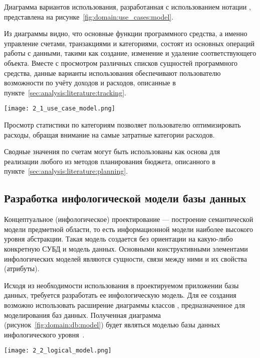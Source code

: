 Диаграмма вариантов использования, разработанная с использованием нотации \uml, представлена на рисунке~\ref{fig:domain:use_cases:model}.

Из диаграммы видно, что основные функции программного средства, а именно управление счетами, транзакциями и категориями, состоят из основных операций работы с данными, такими как создание, изменение и удаление соответствующего объекта.
Вместе с просмотром различных списков сущностей программного средства, данные варианты использования обеспечивают пользователю возможности по учёту доходов и расходов, описанные в пункте~\ref{sec:analysis:literature:tracking}.

\begin{sidewaysfigure}
    \centering
    \texttt{[image: 2\_1\_use\_case\_model.png]}
    \caption{Диаграмма вариантов использования ПС}
    \label{fig:domain:use_cases:model}
\end{sidewaysfigure}

Просмотр статистики по категориям позволяет пользователю оптимизировать расходы, обращая внимание на самые затратные категории расходов.

Сводные значения по счетам могут быть использованы как основа для реализации любого из методов планирования бюджета, описанного в пункте~\ref{sec:analysis:literature:planning}.

\subsection{Разработка инфологической модели базы данных}
\label{sec:domain:db}

Концептуальное (инфологическое) проектирование — построение семантической модели предметной области, то есть информационной модели наиболее высокого уровня абстракции.
Такая модель создается без ориентации на какую-либо конкретную СУБД и модель данных.
Основными конструктивными элементами инфологических моделей являются сущности, связи между ними и их свойства (атрибуты).

Исходя из необходимости использования в проектируемом приложении базы данных, требуется разработать ее инфологическую модель.
Для ее создания возможно использовать расширение диаграммы классов \uml, предназначенное для моделирования баз данных.
Полученная диаграмма (рисунок~\ref{fig:domain:db:model}) будет являться моделью базы данных инфологического уровня~\cite{kulikov_db_workbook}.

\begin{sidewaysfigure}
    \centering
    \texttt{[image: 2\_2\_logical\_model.png]}
    \caption{Инфологическая модель базы данных ПС}
    \label{fig:domain:db:model}
\end{sidewaysfigure}

